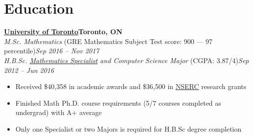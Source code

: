 \documentclass[10pt,letterpaper]{article}
\newcommand*\company[1]{\textbf{#1}}
\newcommand*\position[1]{\textit{#1}}
\newcommand*\location\company
\newcommand*\timespan\position
\begin{document}
\section*{Education}
\company{\href{https://www.utoronto.ca/}{University of Toronto}}\hfill\location{Toronto, ON}\\
\position{M.Sc. Mathematics} (GRE Mathematics Subject Test score: 900 --- 97 percentile)\hfill\timespan{Sep 2016 -- Nov 2017}
\\
\position{H.B.Sc. \href{http://calendar.artsci.utoronto.ca/crs_mat.htm\#ASSPE1165}{Mathematics Specialist} and Computer Science Major} (CGPA: 3.87/4)\hfill\timespan{Sep 2012 -- Jun 2016}
\begin{itemize}
\item Received \$40,358 in academic awards and \$36,500 in \href{http://www.nserc-crsng.gc.ca/index_eng.asp}{NSERC} research grants
\item Finished Math Ph.D. course requirements (5/7 courses completed as undergrad) with A+ average
\item Only one Specialist or two Majors is required for H.B.Sc degree completion
\end{itemize}
\end{document}
